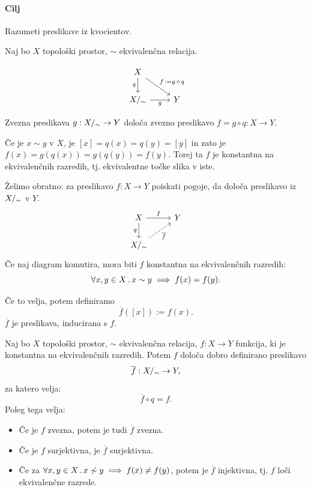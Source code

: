 \paragraph{Cilj} Razumeti preslikave iz kvocientov.

Naj bo \(X\) topološki prostor, \(\sim\) ekvivalenčna relacija.

\[
    \begin{tikzcd}
        X \arrow[swap]{d}{q} \arrow{rd}{f \, := g \,  \circ \, q} &   \\%
        X/_\sim \arrow[swap]{r}{g} & Y
    \end{tikzcd}
\]

Zvezna preslikava \(g: {X/_\sim} \to Y\) določa zvezno preslikavo \(f = g \circ q: X \to Y\).

Če je \(x \sim y\) v \(X\), je \([x] = q(x) = q(y) = [y]\) in zato je \(f(x) = g(q(x)) = g(q(y)) = f(y)\). Torej ta \(f\) je konstantna na ekvivalenčnih razredih, tj. ekvivalentne točke slika v iste.

Želimo obratno: za preslikavo \(f: X \to Y\) poiskati pogoje, da določa preslikavo iz \({X/_\sim}\) v \(Y\).
%
\[
    \begin{tikzcd}
        X \arrow{r}{f} \arrow[swap]{d}{q} & Y \\
        \qs{X} \arrow[dashed, swap]{ru}{\overline{f}}
    \end{tikzcd}
\]
%
Če naj diagram komutira, mora biti \(f\) konstantna na ekvivalenčnih razredih:
\[
    \forall x,y \in X \,.\, x \sim y \implies f(x) = f(y).
\]

Če to velja, potem definiramo \[\overline{f}([x]) := f(x).\]
\(\overline{f}\) je preslikava, inducirana s \(f\).

\begin{trditev}
    Naj bo \(X\) topološki prostor, \(\sim\) ekvivalenčna relacija, \(f: X \to Y\) funkcija, ki je konstantna na ekvivalenčnih razredih. Potem \(f\) določa dobro definirano preslikavo \[\overline{f}: {X/_\sim} \to Y,\] za katero velja: \[\overline{f} \circ q = f.\]
    Poleg tega velja:
    \begin{itemize}
        \item Če je \(f\) zvezna, potem je tudi \(\overline{f}\) zvezna.
        \item Če je \(f\) surjektivna, je \(\overline{f}\) surjektivna.
        \item Če za \(\forall x, y \in X \,.\, x \not \sim y \implies f(x) \neq f(y)\), potem je \(\overline{f}\) injektivna, tj. \(f\) loči ekvivalenčne razrede.
    \end{itemize}
\end{trditev}

